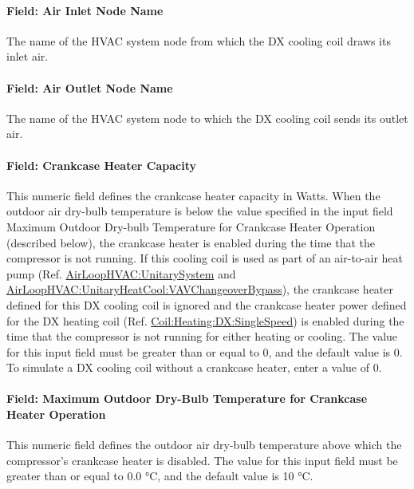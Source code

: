 \paragraph{Field: Air Inlet Node Name}\label{field-air-inlet-node-name-10}

The name of the HVAC system node from which the DX cooling coil draws its inlet air.

\paragraph{Field: Air Outlet Node Name}\label{field-air-outlet-node-name-10}

The name of the HVAC system node to which the DX cooling coil sends its outlet air.

\paragraph{Field: Crankcase Heater Capacity}\label{field-crankcase-heater-capacity-1}

This numeric field defines the crankcase heater capacity in Watts. When the outdoor air dry-bulb temperature is below the value specified in the input field Maximum Outdoor Dry-bulb Temperature for Crankcase Heater Operation (described below), the crankcase heater is enabled during the time that the compressor is not running. If this cooling coil is used as part of an air-to-air heat pump (Ref. \hyperref[airloophvacunitarysystem]{AirLoopHVAC:UnitarySystem} and \hyperref[airloophvacunitaryheatcoolvavchangeoverbypass]{AirLoopHVAC:UnitaryHeatCool:VAVChangeoverBypass}), the crankcase heater defined for this DX cooling coil is ignored and the crankcase heater power defined for the DX heating coil (Ref. \hyperref[coilheatingdxsinglespeed]{Coil:Heating:DX:SingleSpeed}) is enabled during the time that the compressor is not running for either heating or cooling. The value for this input field must be greater than or equal to 0, and the default value is 0. To simulate a DX cooling coil without a crankcase heater, enter a value of 0.

\paragraph{Field: Maximum Outdoor Dry-Bulb Temperature for Crankcase Heater Operation}\label{field-maximum-outdoor-dry-bulb-temperature-for-crankcase-heater-operation-1}

This numeric field defines the outdoor air dry-bulb temperature above which the compressor's crankcase heater is disabled. The value for this input field must be greater than or equal to 0.0 °C, and the default value is 10 °C.

